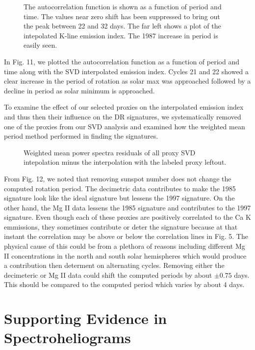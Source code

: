 \documentclass[preprint2]{aastex}
\begin{document}
\begin{figure}[H]
\caption{The autocorrelation function is shown as a function of period and time. The values near zero shift has been suppressed to bring out the peak between 22 and 32 days. The far left shows a plot of the intepolated K-line emission index. The 1987 increase in period is easily seen.}
\end{figure}

In Fig. 11, we plotted the autocorrelation function as a function of period and time along with the SVD interpolated emission index. Cycles 21 and 22 showed a clear increase in the period of rotation as solar max was approached followed by a decline in period as solar minimum is approached. 

To examine the effect of our selected proxies on the interpolated emission index and thus then their influence on the DR signatures, we systematically removed one of the proxies from our SVD analysis and examined how the weighted mean period method performed in finding the signatures.

\begin{figure}[H]
\caption{Weighted mean power spectra residuals of all proxy SVD intepolation minus the interpolation with the labeled proxy leftout. }
\end{figure}

From Fig. 12, we noted that removing  sunspot number does not change the computed rotation period. The decimetric data contributes to make the 1985 signature look like the ideal signature but lessens the 1997 signature. On the other hand, the Mg II data lessens the 1985 signature and contributes to the 1997 signature. Even though each of these proxies are positively correlated to the Ca K emmissions, they sometimes contribute or deter the signature because at that instant the correlation may be above or below the correlation lines in Fig. 5. The physical cause of this could be from a plethora of reasons including different Mg II concentrations in the north and south solar hemispheres which would produce a contribution then determent on alternating cycles. Removing either the decimeteric or Mg II data could shift the computed periods by about $\pm 0.75$ days. This should be compared to the computed period which varies by about 4 days.

\section{Supporting Evidence in Spectroheliograms}
\end{document}
